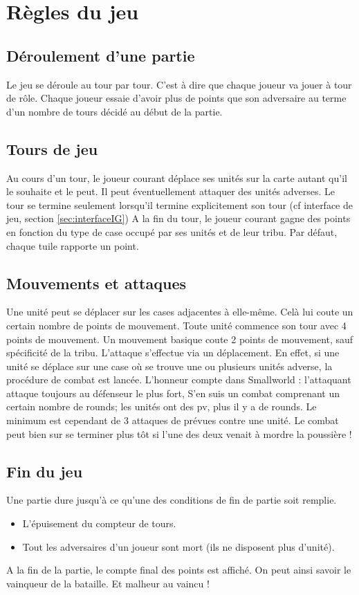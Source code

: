 ﻿\section{Règles du jeu}
	\label{sec:regles}
	\subsection{Déroulement d'une partie}
		Le jeu se déroule au tour par tour. C'est à dire que chaque joueur va jouer à tour de rôle.
		Chaque joueur essaie d'avoir plus de points que son adversaire au terme d'un nombre de tours décidé au début de la partie.
	
	\subsection{Tours de jeu}
		Au cours d'un tour, le joueur courant déplace ses unités sur la carte autant qu'il le souhaite et le peut. Il peut éventuellement attaquer des unités adverses.
		Le tour se termine seulement lorsqu'il termine explicitement son tour (cf interface de jeu, section \ref{sec:interfaceIG})
		A la fin du tour, le joueur courant gagne des points en fonction du type de case occupé par ses unités et de leur tribu. 
		Par défaut, chaque tuile rapporte un point.
		
	\subsection{Mouvements et attaques}
		Une unité peut se déplacer sur les cases adjacentes à elle-même. Celà lui coute un certain nombre de points de mouvement.
		Toute unité commence son tour avec 4 points de mouvement. Un mouvement basique coute 2 points de mouvement, sauf spécificité de la tribu.
		L'attaque s'effectue via un déplacement.
		En effet, si une unité se déplace sur une case où se trouve une ou plusieurs unités adverse, la procédure de combat est lancée.
		\newline
		L'honneur compte dans Smallworld : l'attaquant attaque toujours au défenseur le plus fort, 
		S'en suis un combat comprenant un certain nombre de rounds; les unités ont des pv, plus il y a de rounds. Le minimum est cependant de 3 attaques de prévues contre une unité.
		Le combat peut bien sur se terminer plus tôt si l'une des deux venait à mordre la poussière !
	
	\subsection{Fin du jeu}
		Une partie dure jusqu'à ce qu'une des conditions de fin de partie soit remplie.
		\begin{itemize}
		  \item L'épuisement du compteur de tours.
		  \item Tout les adversaires d'un joueur sont mort (ils ne disposent plus d'unité).
		\end{itemize}
		A la fin de la partie, le compte final des points est affiché. On peut ainsi savoir le vainqueur de la bataille.
		Et malheur au vaincu !
		
